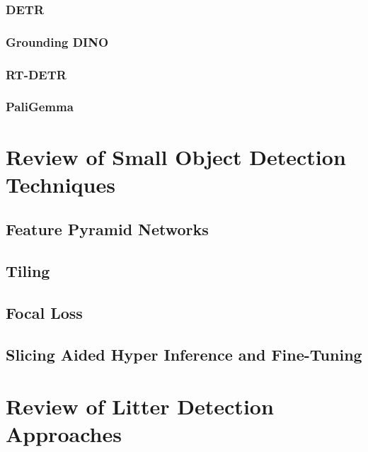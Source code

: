 \subsubsection{DETR}
\label{subsubsec:3_detr}

\subsubsection{Grounding DINO}
\label{subsubsec:3_groundingdino}

\subsubsection{RT-DETR}
\label{subsubsec:3_rt_detr}

\subsubsection{PaliGemma}
\label{subsubsec:3_paligemma}

\section{Review of Small Object Detection Techniques}
\label{sec:3_small_detection}

\subsection{Feature Pyramid Networks}
\label{subsec:3_fpn}

\subsection{Tiling}
\label{subsec:3_tiling}

\subsection{Focal Loss}
\label{subsec:3_focalLoss}

\subsection{Slicing Aided Hyper Inference and Fine-Tuning}
\label{subsec:3_sahi}

\section{Review of Litter Detection Approaches}
\label{sec:3_litter}

